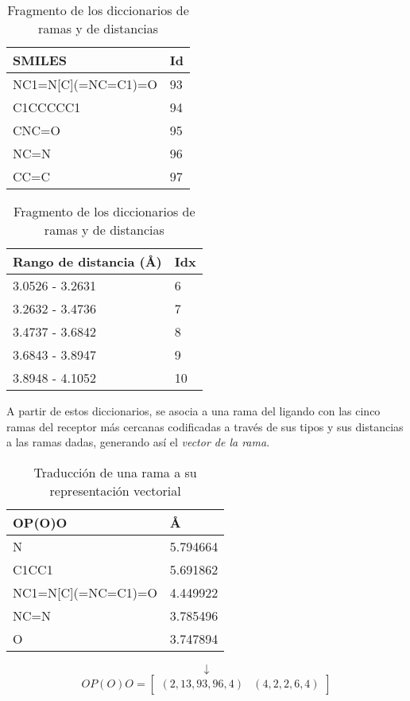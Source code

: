 \begin{table}[H]
  \begin{center}
    \begin{tabular}{l|l}
      SMILES                 & Id \\ \hline
      NC1=N{[}C{]}(=NC=C1)=O & 93 \\
      C1CCCCC1               & 94 \\
      CNC=O                  & 95 \\
      NC=N                   & 96 \\
      CC=C                   & 97
    \end{tabular}
    \begin{tabular}{l|l}
      Rango de distancia (\AA) & Idx \\ \hline
      3.0526 - 3.2631        & 6   \\
      3.2632 - 3.4736        & 7   \\
      3.4737 - 3.6842        & 8   \\
      3.6843 - 3.8947        & 9   \\
      3.8948 - 4.1052        & 10
    \end{tabular}
  \end{center}
  \caption{Fragmento de los diccionarios de ramas y de distancias}
  \label{fig:dictionary}
\end{table}

A partir de estos diccionarios, se asocia a una rama del ligando con
las cinco ramas del receptor más cercanas codificadas a través de sus
tipos y sus distancias a las ramas dadas, generando así el
\textit{vector de la rama}.

\begin{table}[H]
  \begin{center}
  \begin{tabular}{l|l}
    OP(O)O                 & \AA        \\ \hline
    N                      & 5.794664 \\
    C1CC1                  & 5.691862 \\
    NC1=N{[}C{]}(=NC=C1)=O & 4.449922 \\
    NC=N                   & 3.785496 \\
    O                      & 3.747894
  \end{tabular}
  \end{center}
  \begin{equation*}
  \downarrow
  \end{equation*}
  \begin{equation*}
    OP(O)O=\begin{bmatrix}
    (2, 13, 93, 96, 4) & (4, 2, 2, 6, 4)
    \end{bmatrix}
  \end{equation*}
  \caption{Traducción de una rama a su representación vectorial}
\end{table}

